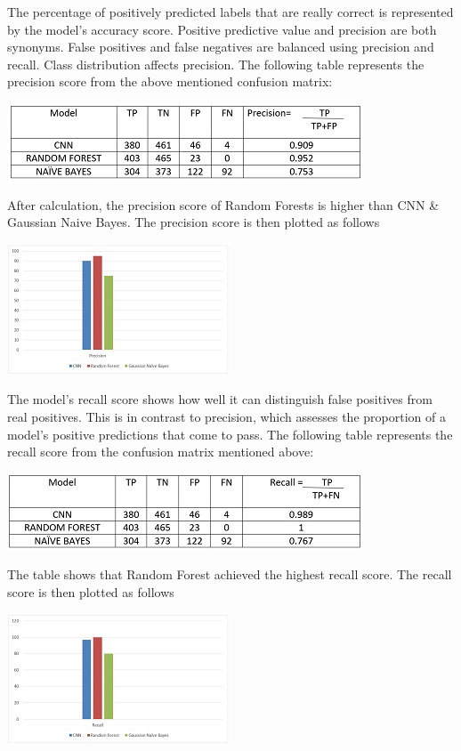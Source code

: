 \par The percentage of positively predicted labels that are really correct is represented by the model's accuracy score. Positive predictive value and precision are both synonyms. False positives and false negatives are balanced using precision and recall. Class distribution affects precision. The following table represents the precision score from the above mentioned confusion matrix:
\begin{center}
    \includegraphics[]{tb2.jpg}
\end{center}
\par After calculation, the precision score of Random Forests is higher than CNN \& Gaussian Naive Bayes. The precision score is then plotted as follows
\begin{center}
    \includegraphics[]{g1.jpg}
\end{center}
\par The model's recall score shows how well it can distinguish false positives from real positives. This is in contrast to precision, which assesses the proportion of a model's positive predictions that come to pass. The following table represents the recall score from the confusion matrix mentioned above:
\begin{center}
    \includegraphics[]{tb3.jpg}
\end{center}
\par The table shows that Random Forest achieved the highest recall score. The recall score is then plotted as follows
\begin{center}
    \includegraphics[]{g2.jpg}
\end{center}
